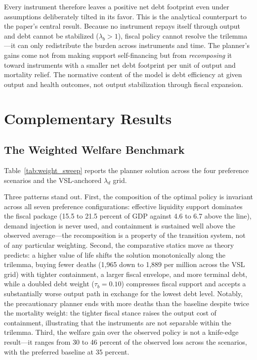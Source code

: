 \documentclass[12pt, a4paper]{article}
\begin{document}
Every instrument therefore leaves a positive net debt footprint even under
assumptions deliberately tilted in its favor. This is the analytical counterpart
to the paper's central result. Because no instrument repays itself through output
and debt cannot be stabilized ($\lambda_b > 1$), fiscal policy cannot resolve the
trilemma---it can only redistribute the burden across instruments and time. The
planner's gains come not from making support self-financing but from
\emph{recomposing} it toward instruments with a smaller net debt footprint per
unit of output and mortality relief. The normative content of the model is debt
efficiency at given output and health outcomes, not output stabilization through
fiscal expansion.

\section{Complementary Results}
\label{app:compl_results}
\subsection{The Weighted Welfare Benchmark}
\label{subsec:results_weighted}
Table~\ref{tab:weight_sweep} reports the planner solution across the four preference scenarios and the VSL-anchored \(\lambda_d\) grid.

Three patterns stand out. First, the composition of the optimal policy is
invariant across all seven preference configurations: effective liquidity
support dominates the fiscal package (15.5 to 21.5 percent of GDP against 4.6
to 6.7 above the line), demand injection is never used, and containment is
sustained well above the observed average---the recomposition is a property of
the transition system, not of any particular weighting. Second, the
comparative statics move as theory predicts: a higher value of life shifts the
solution monotonically along the trilemma, buying fewer deaths (1,965 down to
1,889 per million across the VSL grid) with tighter containment, a larger
fiscal envelope, and more terminal debt, while a doubled debt weight
(\(\tau_b = 0.10\)) compresses fiscal support and accepts a substantially
worse output path in exchange for the lowest debt level. Notably, the
precautionary planner ends with more deaths than the baseline despite
twice the mortality weight: the tighter fiscal stance raises the output cost
of containment, illustrating that the instruments are not separable within the
trilemma. Third, the welfare gain over the observed policy is not a knife-edge
result---it ranges from 30 to 46 percent of the observed loss across the
scenarios, with the preferred baseline at 35 percent.
\end{document}
